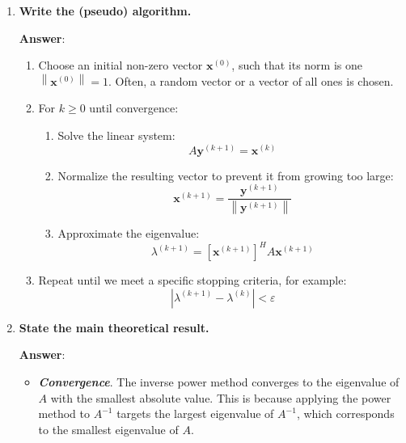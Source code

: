 \begin{enumerate}[label=\textcolor{Green3}{\textbf{\arabic*.}}]


    \item \textcolor{Green3}{\textbf{Write the (pseudo) algorithm.}}
    
    \textbf{Answer}:
    \begin{enumerate}
        \item Choose an initial non-zero vector $\mathbf{x}^{(0)}$, such that its norm is one $\left\| \mathbf{x}^{\left(0\right)} \right\| = 1$. Often, a random vector or a vector of all ones is chosen.

        \item For $k \ge 0$ until convergence:
        \begin{enumerate}
            \item Solve the linear system:
            \begin{equation*}
                A \mathbf{y}^{(k+1)} = \mathbf{x}^{(k)}
            \end{equation*}
            \item Normalize the resulting vector to prevent it from growing too large:
            \begin{equation*}
                \mathbf{x}^{(k+1)} = \frac{\mathbf{y}^{(k+1)}}{\left\|\mathbf{y}^{(k+1)}\right\|}
            \end{equation*}
            \item Approximate the eigenvalue:
            \begin{equation*}
                \lambda^{(k+1)} = \left[\mathbf{x}^{\left(k+1\right)}\right]^{H} A \mathbf{x}^{\left(k+1\right)}
            \end{equation*}
        \end{enumerate}

        \item Repeat until we meet a specific stopping criteria, for example:
        \begin{equation*}
            \left|\lambda^{(k+1)} - \lambda^{(k)}\right| < \varepsilon
        \end{equation*}
    \end{enumerate}


    \newpage

    \item \textcolor{Green3}{\textbf{State the main theoretical result.}}
    
    \textbf{Answer}: 
    \begin{itemize}
        \item \textbf{\emph{Convergence}}. The inverse power method converges to the eigenvalue of $A$ with the smallest absolute value. This is because applying the power method to $A^{-1}$ targets the largest eigenvalue of $A^{-1}$, which corresponds to the smallest eigenvalue of $A$.
        

\end{itemize}
\end{enumerate}
